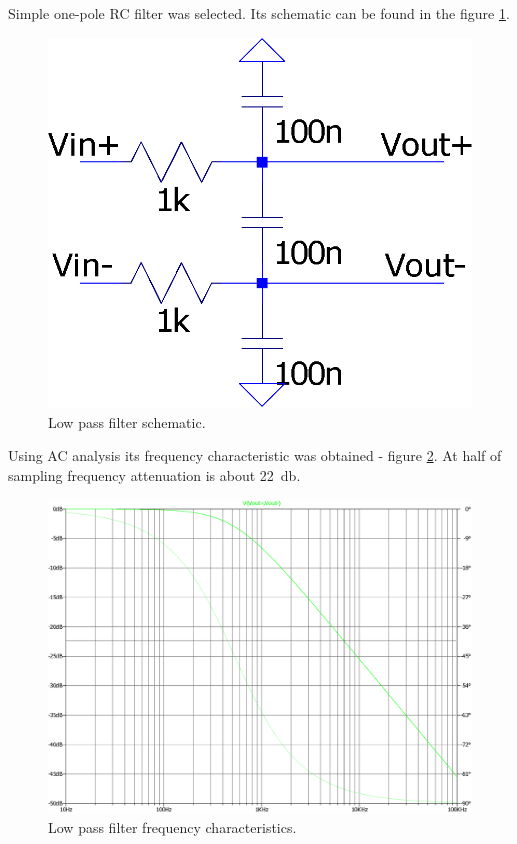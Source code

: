         Simple one-pole RC filter was selected. Its schematic can be found in the figure \ref{low_pass_filter}.

        \begin{figure}[H]
            \centering
            \includegraphics[width=0.3\paperwidth]{img/06/low_pass_filter.eps}
            \caption{Low pass filter schematic.}
            \label{low_pass_filter}
        \end{figure}

        Using AC analysis its frequency characteristic was obtained - figure \ref{low_pass_filter_output}. At half of sampling frequency attenuation is about \SI{22}{\decibel}.

        \begin{figure}[H]
            \centering
            \includegraphics[width=0.7\paperwidth]{img/06/low_pass_filter_output.eps}
            \caption{Low pass filter frequency characteristics.}
            \label{low_pass_filter_output}
        \end{figure}

